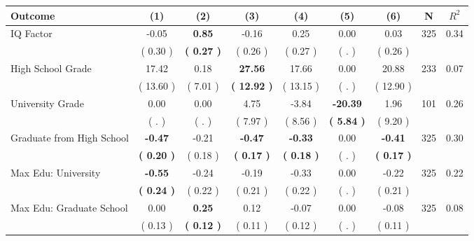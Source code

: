 \begin{tabular}{lcccccccc}
\toprule
 \textbf{Outcome} & \textbf{(1)} & \textbf{(2)} & \textbf{(3)} & \textbf{(4)} & \textbf{(5)} & \textbf{(6)} & \textbf{N} & \textbf{$ R^2$} \\
\midrule
IQ Factor &     -0.05 & \textbf{     0.85} &     -0.16 &      0.25 &      0.00 &      0.03 & 325 &       0.34 \\ 
 & (     0.30 ) & \textbf{(     0.27 )} & (     0.26 ) & (     0.27 ) & (        . ) & (     0.26 ) & \\
High School Grade &     17.42 &      0.18 & \textbf{    27.56} &     17.66 &      0.00 &     20.88 & 233 &       0.07 \\ 
 & (    13.60 ) & (     7.01 ) & \textbf{(    12.92 )} & (    13.15 ) & (        . ) & (    12.90 ) & \\
University Grade &      0.00 &      0.00 &      4.75 &     -3.84 & \textbf{   -20.39} &      1.96 & 101 &       0.26 \\ 
 & (        . ) & (        . ) & (     7.97 ) & (     8.56 ) & \textbf{(     5.84 )} & (     9.20 ) & \\
Graduate from High School & \textbf{    -0.47} &     -0.21 & \textbf{    -0.47} & \textbf{    -0.33} &      0.00 & \textbf{    -0.41} & 325 &       0.30 \\ 
 & \textbf{(     0.20 )} & (     0.18 ) & \textbf{(     0.17 )} & \textbf{(     0.18 )} & (        . ) & \textbf{(     0.17 )} & \\
Max Edu: University & \textbf{    -0.55} &     -0.24 &     -0.19 &     -0.33 &      0.00 &     -0.22 & 325 &       0.22 \\ 
 & \textbf{(     0.24 )} & (     0.22 ) & (     0.21 ) & (     0.22 ) & (        . ) & (     0.21 ) & \\
Max Edu: Graduate School &      0.00 & \textbf{     0.25} &      0.12 &     -0.07 &      0.00 &     -0.08 & 325 &       0.08 \\ 
 & (     0.13 ) & \textbf{(     0.12 )} & (     0.11 ) & (     0.12 ) & (        . ) & (     0.11 ) & \\
\bottomrule
\end{tabular}
